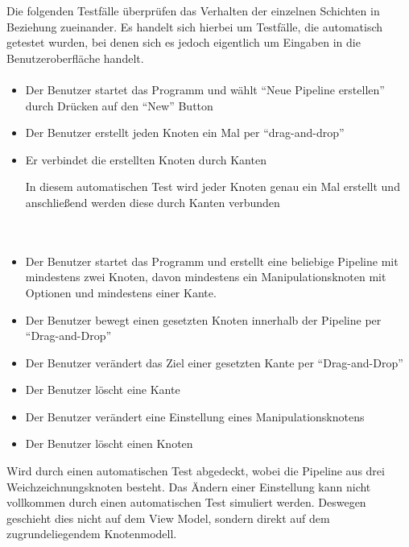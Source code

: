 Die folgenden Testfälle überprüfen das Verhalten der einzelnen Schichten in Beziehung zueinander. Es handelt sich hierbei um Testfälle, die automatisch getestet wurden, bei denen sich es jedoch eigentlich um Eingaben in die Benutzeroberfläche handelt.

\paragraph{}
\begin{itemize}
	\item Der Benutzer startet das Programm und wählt ``Neue Pipeline erstellen'' durch Drücken auf den ``New'' Button
	\item Der Benutzer erstellt jeden Knoten ein Mal per ``drag-and-drop''
	\item Er verbindet die erstellten Knoten durch Kanten
	
	In diesem automatischen Test wird jeder Knoten genau ein Mal erstellt und anschließend werden diese durch Kanten verbunden
\end{itemize}

\paragraph{} ~\\

\begin{itemize}
	\item Der Benutzer startet das Programm und erstellt eine beliebige Pipeline mit mindestens zwei Knoten, davon mindestens ein Manipulationsknoten mit Optionen und mindestens einer Kante.
			\item Der Benutzer bewegt einen gesetzten Knoten innerhalb der Pipeline per ``Drag-and-Drop''
			\item Der Benutzer verändert das Ziel einer gesetzten Kante per ``Drag-and-Drop''
			\item Der Benutzer löscht eine Kante
			\item Der Benutzer verändert eine Einstellung eines Manipulationsknotens
			\item Der Benutzer löscht einen Knoten
\end{itemize}
Wird durch einen automatischen Test abgedeckt, wobei die Pipeline aus drei Weichzeichnungsknoten besteht. Das Ändern einer Einstellung kann nicht vollkommen durch einen automatischen Test simuliert werden. Deswegen geschieht dies nicht auf dem View Model, sondern direkt auf dem zugrundeliegendem Knotenmodell.

